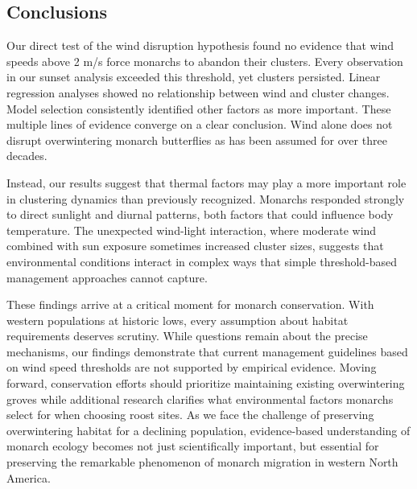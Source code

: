 \subsection{Conclusions}

Our direct test of the wind disruption hypothesis found no evidence that wind speeds above 2 m/s force monarchs to abandon their clusters. Every observation in our sunset analysis exceeded this threshold, yet clusters persisted. Linear regression analyses showed no relationship between wind and cluster changes. Model selection consistently identified other factors as more important. These multiple lines of evidence converge on a clear conclusion. Wind alone does not disrupt overwintering monarch butterflies as has been assumed for over three decades.

Instead, our results suggest that thermal factors may play a more important role in clustering dynamics than previously recognized. Monarchs responded strongly to direct sunlight and diurnal patterns, both factors that could influence body temperature. The unexpected wind-light interaction, where moderate wind combined with sun exposure sometimes increased cluster sizes, suggests that environmental conditions interact in complex ways that simple threshold-based management approaches cannot capture.

These findings arrive at a critical moment for monarch conservation. With western populations at historic lows, every assumption about habitat requirements deserves scrutiny. While questions remain about the precise mechanisms, our findings demonstrate that current management guidelines based on wind speed thresholds are not supported by empirical evidence. Moving forward, conservation efforts should prioritize maintaining existing overwintering groves while additional research clarifies what environmental factors monarchs select for when choosing roost sites. As we face the challenge of preserving overwintering habitat for a declining population, evidence-based understanding of monarch ecology becomes not just scientifically important, but essential for preserving the remarkable phenomenon of monarch migration in western North America.